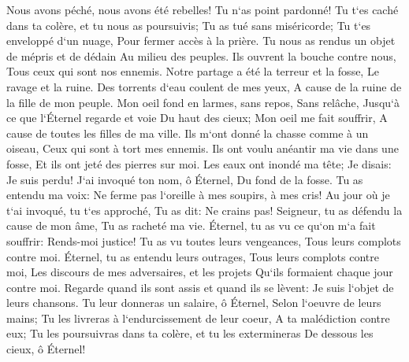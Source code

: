 \verse Nous avons péché, nous avons été rebelles! Tu n`as point pardonné! 
\verse Tu t`es caché dans ta colère, et tu nous as poursuivis; Tu as tué sans miséricorde; 
\verse Tu t`es enveloppé d`un nuage, Pour fermer accès à la prière. 
\verse Tu nous as rendus un objet de mépris et de dédain Au milieu des peuples. 
\verse Ils ouvrent la bouche contre nous, Tous ceux qui sont nos ennemis. 
\verse Notre partage a été la terreur et la fosse, Le ravage et la ruine. 
\verse Des torrents d`eau coulent de mes yeux, A cause de la ruine de la fille de mon peuple. 
\verse Mon oeil fond en larmes, sans repos, Sans relâche, 
\verse Jusqu`à ce que l`Éternel regarde et voie Du haut des cieux; 
\verse Mon oeil me fait souffrir, A cause de toutes les filles de ma ville. 
\verse Ils m`ont donné la chasse comme à un oiseau, Ceux qui sont à tort mes ennemis. 
\verse Ils ont voulu anéantir ma vie dans une fosse, Et ils ont jeté des pierres sur moi. 
\verse Les eaux ont inondé ma tête; Je disais: Je suis perdu! 
\verse J`ai invoqué ton nom, ô Éternel, Du fond de la fosse. 
\verse Tu as entendu ma voix: Ne ferme pas l`oreille à mes soupirs, à mes cris! 
\verse Au jour où je t`ai invoqué, tu t`es approché, Tu as dit: Ne crains pas! 
\verse Seigneur, tu as défendu la cause de mon âme, Tu as racheté ma vie. 
\verse Éternel, tu as vu ce qu`on m`a fait souffrir: Rends-moi justice! 
\verse Tu as vu toutes leurs vengeances, Tous leurs complots contre moi. 
\verse Éternel, tu as entendu leurs outrages, Tous leurs complots contre moi, 
\verse Les discours de mes adversaires, et les projets Qu`ils formaient chaque jour contre moi. 
\verse Regarde quand ils sont assis et quand ils se lèvent: Je suis l`objet de leurs chansons. 
\verse Tu leur donneras un salaire, ô Éternel, Selon l`oeuvre de leurs mains; 
\verse Tu les livreras à l`endurcissement de leur coeur, A ta malédiction contre eux; 
\verse Tu les poursuivras dans ta colère, et tu les extermineras De dessous les cieux, ô Éternel! 

